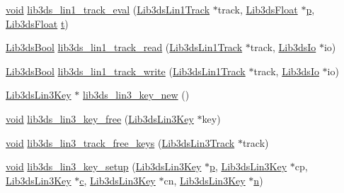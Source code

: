 \begin{DoxyCompactItemize}
\item 
\hyperlink{group___u_a_v_objects_plugin_ga444cf2ff3f0ecbe028adce838d373f5c}{void} \hyperlink{group__tracks_ga07f4c60d12076ce92cbae8ce93be412a}{lib3ds\-\_\-lin1\-\_\-track\-\_\-eval} (\hyperlink{struct_lib3ds_lin1_track}{Lib3ds\-Lin1\-Track} $\ast$track, \hyperlink{types_8h_ab18e70f51f9a53c9dee8d930c8e1a7bf}{Lib3ds\-Float} $\ast$\hyperlink{glext_8h_aa5367c14d90f462230c2611b81b41d23}{p}, \hyperlink{types_8h_ab18e70f51f9a53c9dee8d930c8e1a7bf}{Lib3ds\-Float} \hyperlink{glext_8h_a00140d6f5c548b26daf170bf16e86a6d}{t})
\item 
\hyperlink{types_8h_a89dd7398a9ebbbf28011f8c32df67ad3}{Lib3ds\-Bool} \hyperlink{group__tracks_ga8f5763d49369825683fafd40c1e2f3e3}{lib3ds\-\_\-lin1\-\_\-track\-\_\-read} (\hyperlink{struct_lib3ds_lin1_track}{Lib3ds\-Lin1\-Track} $\ast$track, \hyperlink{struct_lib3ds_io}{Lib3ds\-Io} $\ast$io)
\item 
\hyperlink{types_8h_a89dd7398a9ebbbf28011f8c32df67ad3}{Lib3ds\-Bool} \hyperlink{group__tracks_gae777b5fe09e8584e18635db7ff10c3c3}{lib3ds\-\_\-lin1\-\_\-track\-\_\-write} (\hyperlink{struct_lib3ds_lin1_track}{Lib3ds\-Lin1\-Track} $\ast$track, \hyperlink{struct_lib3ds_io}{Lib3ds\-Io} $\ast$io)
\item 
\hyperlink{struct_lib3ds_lin3_key}{Lib3ds\-Lin3\-Key} $\ast$ \hyperlink{group__tracks_ga868e72461de840b4a65da914fea76301}{lib3ds\-\_\-lin3\-\_\-key\-\_\-new} ()
\item 
\hyperlink{group___u_a_v_objects_plugin_ga444cf2ff3f0ecbe028adce838d373f5c}{void} \hyperlink{group__tracks_gafa19a496403ee992e3157ed5b8f3e3d4}{lib3ds\-\_\-lin3\-\_\-key\-\_\-free} (\hyperlink{struct_lib3ds_lin3_key}{Lib3ds\-Lin3\-Key} $\ast$key)
\item 
\hyperlink{group___u_a_v_objects_plugin_ga444cf2ff3f0ecbe028adce838d373f5c}{void} \hyperlink{group__tracks_gadf92cabf129f8ca290a3c3342a7b6111}{lib3ds\-\_\-lin3\-\_\-track\-\_\-free\-\_\-keys} (\hyperlink{struct_lib3ds_lin3_track}{Lib3ds\-Lin3\-Track} $\ast$track)
\item 
\hyperlink{group___u_a_v_objects_plugin_ga444cf2ff3f0ecbe028adce838d373f5c}{void} \hyperlink{group__tracks_ga32ec773465e1e1d99696948cfaa04886}{lib3ds\-\_\-lin3\-\_\-key\-\_\-setup} (\hyperlink{struct_lib3ds_lin3_key}{Lib3ds\-Lin3\-Key} $\ast$\hyperlink{glext_8h_aa5367c14d90f462230c2611b81b41d23}{p}, \hyperlink{struct_lib3ds_lin3_key}{Lib3ds\-Lin3\-Key} $\ast$cp, \hyperlink{struct_lib3ds_lin3_key}{Lib3ds\-Lin3\-Key} $\ast$\hyperlink{glext_8h_a1f2d7f8147412c43ba2303a56f97ee73}{c}, \hyperlink{struct_lib3ds_lin3_key}{Lib3ds\-Lin3\-Key} $\ast$cn, \hyperlink{struct_lib3ds_lin3_key}{Lib3ds\-Lin3\-Key} $\ast$\hyperlink{glext_8h_a4eacae1d9e7c39f8236bb36d4ececa77}{n})

\end{DoxyCompactItemize}
